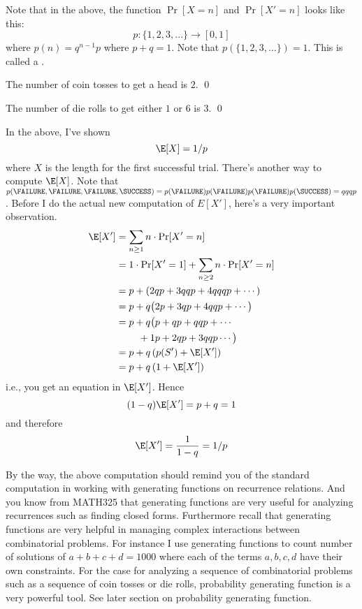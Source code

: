 Note that in the above, the function $\Pr[X = n]$ and $\Pr[X' = n]$ looks like this:
\[
p: \{1, 2, 3, ... \} \rightarrow [0, 1]
\]
where $p(n) = q^{n-1}p$ where $p + q = 1$.
Note that $p(\{1, 2, 3, ...\}) = 1$.
This is called a .

 

\begin{eg}
  The number of coin tosses to get a head is $2$.
  \qed
\end{eg}

\begin{eg}
  The number of die rolls to get either $1$ or $6$ is $3$.
  \qed
\end{eg}

In the above, I've shown
\[
\E[X] = 1/p 
\]
where $X$ is the length for the first successful trial.
There's another way to compute $\E[X]$.
Note that 
$p(\FAILURE, \FAILURE, \FAILURE, \SUCCESS)
= p(\FAILURE) p(\FAILURE) p(\FAILURE) p(\SUCCESS) = qqqp$.
Before I do the actual new computation of $E[X']$, here's a very important observation.
\begin{align*}
  \E[X']
  &= \sum_{n \geq 1} n \cdot \Pr[X' = n] \\
  &= 1 \cdot \Pr[X' = 1] + \sum_{n \geq 2} n \cdot \Pr[X' = n] \\
  &= p + \left( 2 qp + 3 qqp + 4 qqqp + \cdots \right) \\
  &= p + q \bigl( 2 p + 3 qp + 4 qqp + \cdots \bigr) \\
  &= p + q\bigl( p + qp + qqp + \cdots \\
  &\hspace{0.8cm} + 1 p + 2 qp + 3 qqp \cdots \bigr) \\
  &= p + q\left( p(S') + \E[X'] \right) \\
  &= p + q\left( 1 + \E[X'] \right)
\end{align*}
i.e., you get an equation in $\E[X']$.
Hence
\[
(1 - q)\E[X'] = p + q = 1
\]
and therefore
\[
\E[X'] = \frac{1}{1 - q} = 1/p
\]

By the way, the above computation
should remind you of the standard computation in
working with generating functions on recurrence relations.
And you know from MATH325 that generating functions are very
useful for analyzing recurrences such as finding closed forms.
Furthermore recall that generating functions are very helpful
in managing complex interactions between combinatorial problems.
For instance I use generating functions to count number of
solutions of $a + b + c + d = 1000$ where each of the terms
$a,b,c,d$ have their own constraints.
For the case for analyzing a sequence of
combinatorial problems such as a sequence of coin tosses or
die rolls, probability generating function is a very powerful tool.
See later section on probability generating function.

